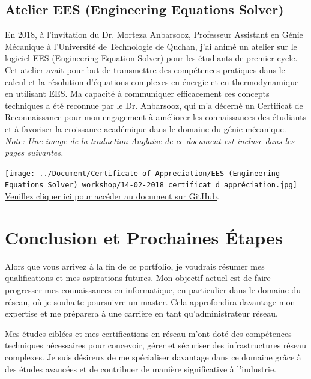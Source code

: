 \documentclass{article}
\begin{document}
    \subsection{Atelier EES (Engineering Equations Solver)}
    En 2018, à l'invitation du Dr. Morteza Anbarsooz, Professeur Assistant en Génie Mécanique à l'Université de Technologie de Quchan, j'ai animé un atelier sur le logiciel EES (Engineering Equation Solver) pour les étudiants de premier cycle. Cet atelier avait pour but de transmettre des compétences pratiques dans le calcul et la résolution d'équations complexes en énergie et en thermodynamique en utilisant EES. Ma capacité à communiquer efficacement ces concepts techniques a été reconnue par le Dr. Anbarsooz, qui m'a décerné un Certificat de Reconnaissance pour mon engagement à améliorer les connaissances des étudiants et à favoriser la croissance académique dans le domaine du génie mécanique.
    \newline
    \newline
    \textit {Note: Une image de la traduction Anglaise de ce document est incluse dans les pages suivantes.}


    \newpage
    
        \begin{center}
            \texttt{[image: ../Document/Certificate of Appreciation/EES (Engineering Equations Solver) workshop/14-02-2018 certificat d\_appréciation.jpg]}
            \footnotesize
             \href{https://github.com/jafarizadeh/CV---lettre/tree/903818f42bc563b419f3283c49cc84e05cf3932d/Document/Certificate%20of%20Appreciation/EES%20(Engineering%20Equations%20Solver)%20workshop}{Veuillez cliquer ici pour accéder au document sur GitHub}.
        \end{center}
    \newpage


\section{Conclusion et Prochaines Étapes}

Alors que vous arrivez à la fin de ce portfolio, je voudrais résumer mes qualifications et mes aspirations futures. Mon objectif actuel est de faire progresser mes connaissances en informatique, en particulier dans le domaine du réseau, où je souhaite poursuivre un master. Cela approfondira davantage mon expertise et me préparera à une carrière en tant qu'administrateur réseau.

Mes études ciblées et mes certifications en réseau m'ont doté des compétences techniques nécessaires pour concevoir, gérer et sécuriser des infrastructures réseau complexes. Je suis désireux de me spécialiser davantage dans ce domaine grâce à des études avancées et de contribuer de manière significative à l'industrie.
\end{document}
